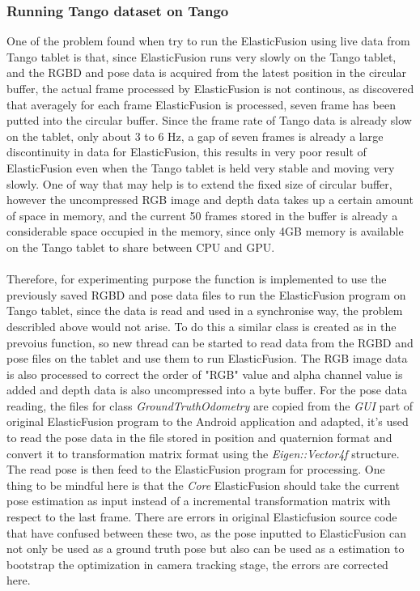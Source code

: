 \documentclass[12pt,twoside]{article}
\begin{document}
\subsubsection{Running Tango dataset on Tango}
One of the problem found when try to run the ElasticFusion using live data from Tango tablet is that, since ElasticFusion runs very slowly on the Tango tablet, and the RGBD and pose data is acquired from the latest position in the circular buffer, the actual frame processed by ElasticFusion is not continous, as discovered that averagely for each frame ElasticFusion is processed, seven frame has been putted into the circular buffer. Since the frame rate of Tango data is already slow on the tablet, only about 3 to 6 Hz, a gap of seven frames is already a large discontinuity in data for ElasticFusion, this results in very poor result of ElasticFusion even when the Tango tablet is held very stable and moving very slowly. One of way that may help is to extend the fixed size of circular buffer, however the uncompressed RGB image and depth data takes up a certain amount of space in memory, and the current 50 frames stored in the buffer is already a considerable space occupied in the memory, since only 4GB memory is available on the Tango tablet to share between CPU and GPU.\\
\\
Therefore, for experimenting purpose the function is implemented to use the previously saved RGBD and pose data files to run the ElasticFusion program on Tango tablet, since the data is read and used in a synchronise way, the problem describled above would not arise. To do this a similar class is created as in the prevoius function, so new thread can be started to read data from the RGBD and pose files on the tablet and use them to run ElasticFusion. The RGB image data is also processed to correct the order of "RGB" value and alpha channel value is added and depth data is also uncompressed into a byte buffer. For the pose data reading, the files for class \textit{GroundTruthOdometry} are copied from the \textit{GUI} part of original ElasticFusion program to the Android application and adapted, it's used to read the pose data in the file stored in position and quaternion format and convert it to transformation matrix format using the \textit{Eigen::Vector4f} structure. The read pose is then feed to the ElasticFusion program for processing. One thing to be mindful here is that the \textit{Core} ElasticFusion should take the current pose estimation as input instead of a incremental transformation matrix with respect to the last frame. There are errors in original Elasticfusion source code that have confused between these two, as the pose inputted to ElasticFusion can not only be used as a ground truth pose but also can be used as a estimation to bootstrap the optimization in camera tracking stage, the errors are corrected here.\\
\end{document}
